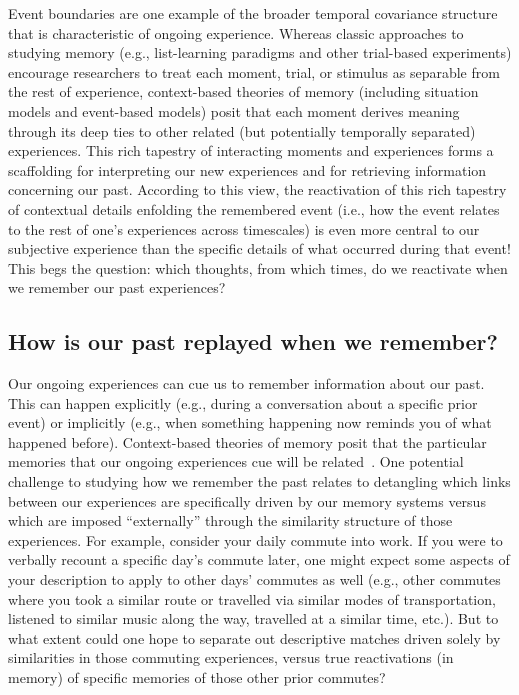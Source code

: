 \documentclass{article}
\begin{document}
Event boundaries are one example of the broader temporal covariance structure that is characteristic of ongoing experience.  Whereas classic approaches to studying memory (e.g., list-learning paradigms and other trial-based experiments) encourage researchers to treat each moment, trial, or stimulus as separable from the rest of experience, context-based theories of memory (including situation models and event-based models) posit that each moment derives meaning through its deep ties to other related (but potentially temporally separated) experiences.  This rich tapestry of interacting moments and experiences forms a scaffolding for interpreting our new experiences and for retrieving information concerning our past.  According to this view, the reactivation of this rich tapestry of contextual details enfolding the remembered event (i.e., how the event relates to the rest of one's experiences across timescales) is even more central to our subjective experience than the specific details of what occurred during that event!  This begs the question: which thoughts, from which times, do we reactivate when we remember our past experiences?

\subsection*{How is our past replayed when we remember?}
Our ongoing experiences can cue us to remember information about our past.  This can happen explicitly (e.g., during a conversation about a specific prior event) or implicitly (e.g., when something happening now reminds you of what happened before).  Context-based theories of memory posit that the particular memories that our ongoing experiences cue will be related~\citep[contextually, semantically, functionally, etc.; e.g., ][]{PolyEtal09}.  One potential challenge to studying how we remember the past relates to detangling which links between our experiences are specifically driven by our memory systems versus which are imposed ``externally'' through the similarity structure of those experiences.  For example, consider your daily commute into work.  If you were to verbally recount a specific day's commute later, one might expect some aspects of your description to apply to other days' commutes as well (e.g., other commutes where you took a similar route or travelled via similar modes of transportation, listened to similar music along the way, travelled at a similar time, etc.).  But to what extent could one hope to separate out descriptive matches driven solely by similarities in those commuting experiences, versus true reactivations (in memory) of specific memories of those other prior commutes?
\end{document}
